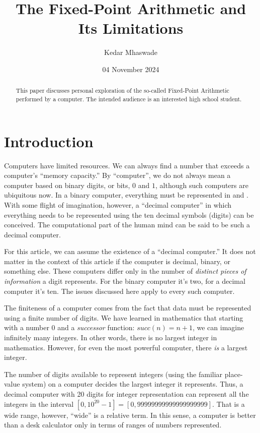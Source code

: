 \documentclass[10pt]{article}         %
\title{The Fixed-Point Arithmetic and Its Limitations}
\author{Kedar Mhaswade}
\date{04 November 2024}
\begin{document}
\maketitle

\begin{abstract}
This paper discusses personal exploration of the so-called Fixed-Point Arithmetic performed by a computer. The intended audience is an interested high school student.
\end{abstract}

\section{Introduction}
Computers have limited resources. We can always find a number that exceeds a computer's ``memory capacity.'' By ``computer'', we do not always mean a computer based on binary digits, or bits, $0$ and $1$, although such computers are ubiquitous now. In a binary computer, everything must be represented in  and . With some flight of imagination, however, a ``decimal computer'' in which everything needs to be represented using the ten decimal symbols (digits) can be conceived. The computational part of the human mind can be said to be such a decimal computer.

For this article, we can assume the existence of a ``decimal computer.'' It does not matter in the context of this article if the computer is decimal, binary, or something else. These computers differ only in the number of \textit{distinct pieces of information} a digit represents. For the binary computer it's two, for a decimal computer it's ten. The issues discussed here apply to every such computer.

The finiteness of a computer comes from the fact that data must be represented using a finite number of digits. We have learned in mathematics that starting with a number $0$ and a \textit{successor} function: $succ(n) = n + 1$, we can imagine infinitely many integers. In other words, there is no largest integer in mathematics. However, for even the most powerful computer, there \textit{is} a largest integer.

The number of digits available to represent integers (using the familiar place-value system) on a computer decides the largest integer it represents. Thus, a decimal computer with 20 digits for integer representation can represent all the integers in the interval $[0,{10}^{20}-1]=[0,99999999999999999999]$. That is a wide range, however, ``wide'' is a relative term. In this sense, a computer is better than a desk calculator only in terms of ranges of numbers represented.
\end{document}
